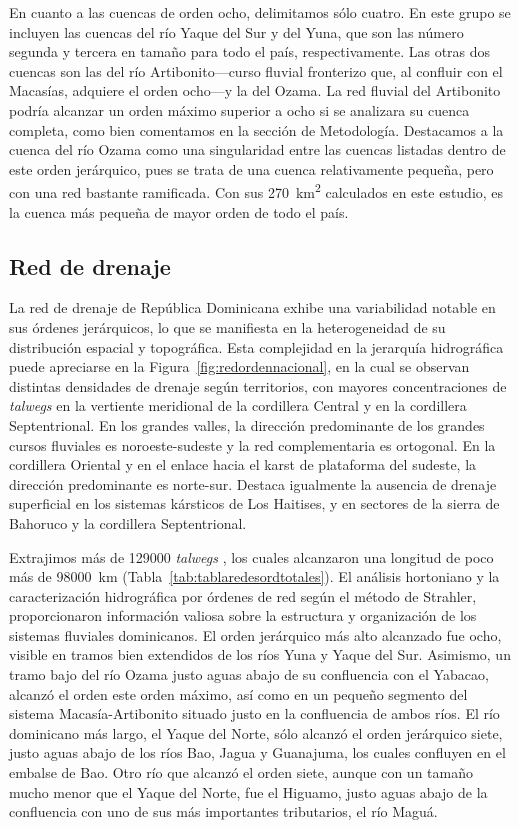 \documentclass[spanish]{article}
\begin{document}
En cuanto a las cuencas de orden ocho, delimitamos sólo cuatro. En este
grupo se incluyen las cuencas del río Yaque del Sur y del Yuna, que son
las número segunda y tercera en tamaño para todo el país,
respectivamente. Las otras dos cuencas son las del río
Artibonito---curso fluvial fronterizo que, al confluir con el Macasías,
adquiere el orden ocho---y la del Ozama. La red fluvial del Artibonito
podría alcanzar un orden máximo superior a ocho si se analizara su
cuenca completa, como bien comentamos en la sección de Metodología.
Destacamos a la cuenca del río Ozama como una singularidad entre las
cuencas listadas dentro de este orden jerárquico, pues se trata de una
cuenca relativamente pequeña, pero con una red bastante ramificada. Con
sus 270~km\textsuperscript{2} calculados en este estudio, es la cuenca
más pequeña de mayor orden de todo el país.

\hypertarget{red-de-drenaje}{%
\subsection{Red de drenaje}\label{red-de-drenaje}}

La red de drenaje de República Dominicana exhibe una variabilidad
notable en sus órdenes jerárquicos, lo que se manifiesta en la
heterogeneidad de su distribución espacial y topográfica. Esta
complejidad en la jerarquía hidrográfica puede apreciarse en la
Figura~\ref{fig:redordennacional}, en la cual se observan distintas
densidades de drenaje según territorios, con mayores concentraciones de
\emph{talwegs} en la vertiente meridional de la cordillera Central y en
la cordillera Septentrional. En los grandes valles, la dirección
predominante de los grandes cursos fluviales es noroeste-sudeste y la
red complementaria es ortogonal. En la cordillera Oriental y en el
enlace hacia el karst de plataforma del sudeste, la dirección
predominante es norte-sur. Destaca igualmente la ausencia de drenaje
superficial en los sistemas kársticos de Los Haitises, y en sectores de
la sierra de Bahoruco y la cordillera Septentrional.

Extrajimos más de 129000 \emph{talwegs} , los cuales alcanzaron una
longitud de poco más de 98000~km (Tabla~\ref{tab:tablaredesordtotales}).
El análisis hortoniano y la caracterización hidrográfica por órdenes de
red según el método de Strahler, proporcionaron información valiosa
sobre la estructura y organización de los sistemas fluviales
dominicanos. El orden jerárquico más alto alcanzado fue ocho, visible en
tramos bien extendidos de los ríos Yuna y Yaque del Sur. Asimismo, un
tramo bajo del río Ozama justo aguas abajo de su confluencia con el
Yabacao, alcanzó el orden este orden máximo, así como en un pequeño
segmento del sistema Macasía-Artibonito situado justo en la confluencia
de ambos ríos. El río dominicano más largo, el Yaque del Norte, sólo
alcanzó el orden jerárquico siete, justo aguas abajo de los ríos Bao,
Jagua y Guanajuma, los cuales confluyen en el embalse de Bao. Otro río
que alcanzó el orden siete, aunque con un tamaño mucho menor que el
Yaque del Norte, fue el Higuamo, justo aguas abajo de la confluencia con
uno de sus más importantes tributarios, el río Maguá.
\end{document}
